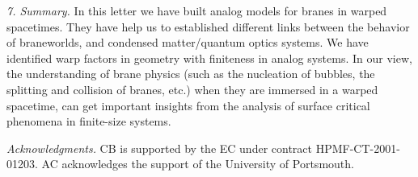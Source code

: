 \documentclass[a4paper,prl,showpacs,twocolumn]{revtex4}
\begin{document}
\noindent
{\it 7. Summary.}
In this letter we have built analog models for branes in warped spacetimes.  
They have help us to established different links
between the behavior of braneworlds, and condensed matter/quantum optics
systems. 
We have identified warp factors in geometry with finiteness in analog 
systems. 
In our view, the understanding of brane physics (such as the
nucleation of bubbles, the splitting and collision of branes, etc.) when
they are immersed in a warped spacetime, can get important insights
from the analysis of surface critical phenomena in finite-size systems.  




\noindent
{\it Acknowledgments.}
CB is supported by the EC under contract HPMF-CT-2001-01203.
AC acknowledges the support of the University of Portsmouth.


\end{document}
